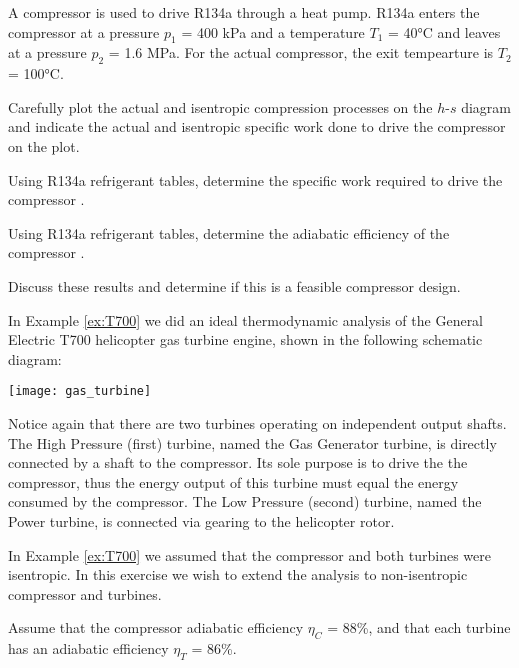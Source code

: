 \begin{homework}
  \question A compressor is used to drive R134a through a heat pump.  R134a enters the compressor at a pressure $p_1$ = 400 kPa and a temperature $T_1$ = 40°C and leaves at a pressure $p_2$ = 1.6 MPa.  For the actual compressor, the exit tempearture is $T_2$ = 100°C.

  \begin{questionparts}
  \item Carefully plot the actual and isentropic compression processes on the $h$-$s$ diagram and indicate the actual and isentropic specific work done to drive the compressor on the plot.
  \item Using R134a refrigerant tables, determine the specific work required to drive the compressor \answer{[43.5 kJ/kg]}.
  \item Using R134a refrigerant tables, determine the adiabatic efficiency of the compressor \answer{[$\eta_C$ = 78\%]}.
  \item Discuss these results and determine if this is a feasible compressor design.
  \end{questionparts}
  \newpage
  \question In Example \ref{ex:T700} we did an ideal thermodynamic analysis of the General Electric T700 helicopter gas turbine engine, shown in the following schematic diagram:
  \begin{center}
    \texttt{[image: gas\_turbine]}
  \end{center}

  Notice again that there are two turbines operating on independent output shafts. The High Pressure (first) turbine, named the Gas Generator turbine, is directly connected by a shaft to the compressor. Its sole purpose is to drive the the compressor, thus the energy output of this turbine must equal the energy consumed by the compressor. The Low Pressure (second) turbine, named the Power turbine, is connected via gearing to the helicopter rotor.

  In Example \ref{ex:T700} we assumed that the compressor and both turbines were isentropic. In this exercise we wish to extend the analysis to non-isentropic compressor and turbines.

  Assume that the compressor adiabatic efficiency $\eta_C$ = 88\%, and that each turbine has an adiabatic efficiency $\eta_T$ = 86\%.


\end{homework}
